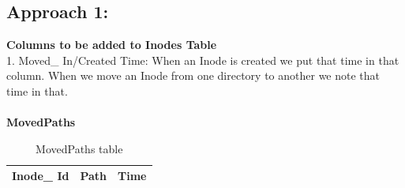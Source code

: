 \subsection{Approach 1:}
\textbf{Columns to be added to Inodes Table}\\
1. Moved\_ In/Created Time: When an Inode is created we put that time in that column. When we move an Inode from one directory to another we note that time in that.\\\\
\textbf{MovedPaths}\\
\begin{table}[h!]
\begin{tabular}{|c|c|c|}
\hline
Inode\_ Id&
Path&
Time\\
\hline
\end{tabular}\\
\caption{MovedPaths table}
\label{movedPaths}
\end{table}


